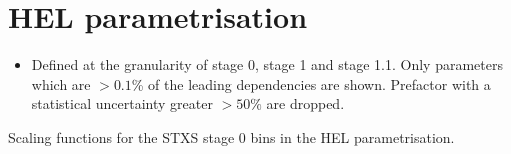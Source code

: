 \chapter{HEL parametrisation}\label{app:hel_parametrisation}

\begin{itemize}
    \item Defined at the granularity of stage 0, stage 1 and stage 1.1. Only parameters which are $>0.1$\% of the leading dependencies are shown. Prefactor with a statistical uncertainty greater $>50\%$ are dropped.
\end{itemize}

\begin{table}[htb!]
  \centering
  \scriptsize
  \renewcommand{\arraystretch}{2}
  \setlength{\tabcolsep}{6pt}
  \caption[Scaling functions for the STXS stage 0 bins]
  {
    Scaling functions for the STXS stage 0 bins in the HEL parametrisation.
  }
  \label{tab:hel_parametrisation}
  \hspace*{-2cm}
  
  \hspace*{-2cm}
\end{table}